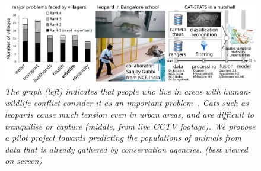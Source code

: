 \documentclass[a4paper,10pt,twocolumn]{article}
\begin{document}
{ 
\Large 
{}
}


\begin{figure}[htbp!]
\begin{center}
 \includegraphics[width=.98\linewidth]{teaser2}
\end{center}
\vspace{-1.5em}
\caption{\emph{The graph (left) indicates that people who live in areas with human-wildlife conflict consider it as an important problem~\cite{owen2013conservation}. Cats such as leopards cause much tension even in urban areas, and are difficult to tranquilise or capture (middle, from live CCTV footage). We propose a pilot project towards predicting the populations of animals from data that is already gathered by conservation agencies. (best viewed on screen)}}
\label{fig:teaser}
\vspace{-1em}
\end{figure}
\end{document}
